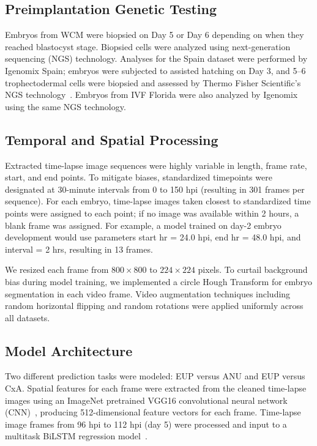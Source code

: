\documentclass[12pt]{article}
\begin{document}
\subsection{Preimplantation Genetic Testing}

Embryos from WCM were biopsied on Day 5 or Day 6 depending on when they reached blastocyst stage. Biopsied cells were analyzed using next-generation sequencing (NGS) technology. Analyses for the Spain dataset were performed by Igenomix Spain; embryos were subjected to assisted hatching on Day 3, and 5--6 trophectodermal cells were biopsied and assessed by Thermo Fisher Scientific's NGS technology~\citep{garciamonleon2019spain}. Embryos from IVF Florida were also analyzed by Igenomix using the same NGS technology.

\subsection{Temporal and Spatial Processing}

Extracted time-lapse image sequences were highly variable in length, frame rate, start, and end points. To mitigate biases, standardized timepoints were designated at 30-minute intervals from 0 to 150 hpi (resulting in 301 frames per sequence). For each embryo, time-lapse images taken closest to standardized time points were assigned to each point; if no image was available within 2 hours, a blank frame was assigned. For example, a model trained on day-2 embryo development would use parameters start hr = 24.0 hpi, end hr = 48.0 hpi, and interval = 2 hrs, resulting in 13 frames.

We resized each frame from $800 \times 800$ to $224 \times 224$ pixels. To curtail background bias during model training, we implemented a circle Hough Transform for embryo segmentation in each video frame. Video augmentation techniques including random horizontal flipping and random rotations were applied uniformly across all datasets.

\subsection{Model Architecture}

Two different prediction tasks were modeled: EUP versus ANU and EUP versus CxA. Spatial features for each frame were extracted from the cleaned time-lapse images using an ImageNet pretrained VGG16 convolutional neural network (CNN)~\citep{simonyan2014vgg}, producing 512-dimensional feature vectors for each frame. Time-lapse image frames from 96 hpi to 112 hpi (day 5) were processed and input to a multitask BiLSTM regression model~\citep{schuster1997bilstm, crawshaw2020mtlsurvey}.
\end{document}
